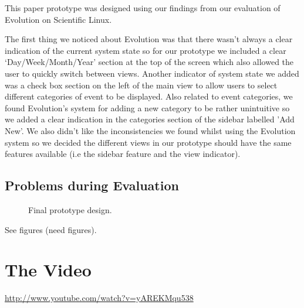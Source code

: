 \documentclass{article}
\begin{document}
This paper prototype was designed using our findings from our evaluation 
of Evolution on Scientific Linux.

The first thing we noticed about Evolution was that there wasn't always
a clear indication of the current system state so for our prototype we
included a clear `Day/Week/Month/Year' section at the top of the screen
which also allowed the user to quickly switch between views. Another
indicator of system state we added was a check box section on the left of
the main view to allow users to select different categories of event to
be displayed. Also related to event categories, we found Evolution's
system for adding a new category to be rather unintuitive so we added a
clear indication in the categories section of the sidebar labelled
'Add New'. We also didn't like the inconsistencies we found whilst
using the Evolution system so we decided the different views in our
prototype should have the same features available (i.e the sidebar
feature and the view indicator).

\subsection{Problems during Evaluation}

\begin{figure}
\centering
\vspace{-50mm}
\caption{Final prototype design.}
\label{fig:ffp}
\end{figure}


See figures (need figures).
\section{The Video}

\url{http://www.youtube.com/watch?v=yAREKMqu538}

\end{document}
